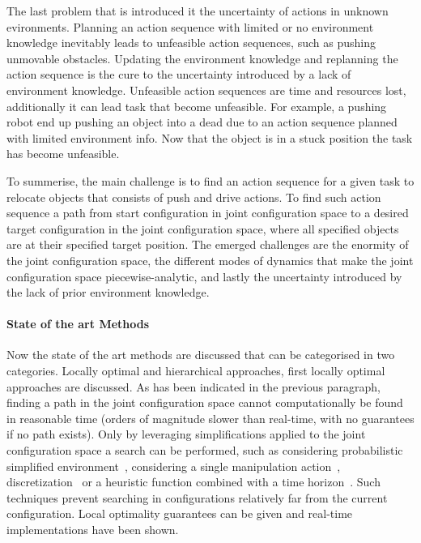 The last problem that is introduced it the uncertainty of actions in unknown evironments. Planning an action sequence with limited or no environment knowledge inevitably leads to unfeasible action sequences, such as pushing unmovable obstacles. Updating the environment knowledge and replanning the action sequence is the cure to the uncertainty introduced by a lack of environment knowledge. Unfeasible action sequences are time and resources lost, additionally it can lead task that become unfeasible. For example, a pushing robot end up pushing an object into a dead due to an action sequence planned with limited environment info. Now that the object is in a stuck position the task has become unfeasible.\bs

To summerise, the main challenge is to find an action sequence for a given task to relocate objects that consists of push and drive actions. To find such action sequence a path from start configuration in joint configuration space to a desired target configuration in the joint configuration space, where all specified objects are at their specified target position. The emerged challenges are the enormity of the joint configuration space, the different modes of dynamics that make the joint configuration space piecewise-analytic, and lastly the uncertainty introduced by the lack of prior environment knowledge.\bs

\paragraph{State of the art Methods}
Now the state of the art methods are discussed that can be categorised in two categories. Locally optimal and hierarchical approaches, first locally optimal approaches are discussed. As has been indicated in the previous paragraph, finding a path in the joint configuration space cannot computationally be found in reasonable time (orders of magnitude slower than real-time, with no guarantees if no path exists). Only by leveraging simplifications applied to the joint configuration space a search can be performed, such as considering probabilistic simplified environment~\cite{vandenberg_path_2009}, considering a single manipulation action~\cite{berenson_manipulation_2009}, discretization~\cite{sabbaghnovin_optimal_2016} or a heuristic function combined with a time horizon~\cite{sabbaghnovin_optimal_2016}. Such techniques prevent searching in configurations relatively far from the current configuration. Local optimality guarantees can be given and real-time implementations have been shown.\bs

